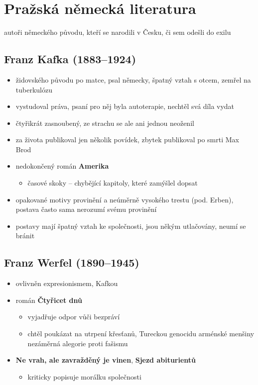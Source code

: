 \section{Pražská německá literatura}
\item autoři německého původu, kteří se narodili v Česku, či sem odešli do exilu
\subsection{Franz Kafka (1883--1924)}
\begin{itemize}
\item židovského původu po matce, psal německy, špatný vztah s otcem, zemřel na tuberkulózu
\item vystudoval práva, psaní pro něj byla autoterapie, nechtěl svá díla vydat
\item čtyřikrát zasnoubený, ze strachu se ale ani jednou neoženil
\item za života publikoval jen několik povídek, zbytek publikoval po smrti Max Brod
\item nedokončený román \textbf{Amerika} 
	\begin{itemize}
	\item časové skoky -- chybějící kapitoly, které zamýšlel dopsat
	\end{itemize}
\item opakované motivy provinění a neúměrně vysokého trestu (pod. Erben), postava často sama nerozumí svému provinění
\item postavy mají špatný vztah ke společnosti, jsou někým utlačovány, neumí se bránit	

\end{itemize}

\subsection{Franz Werfel (1890--1945)}
\begin{itemize}
\item ovlivněn expresionismem, Kafkou
\item román \textbf{Čtyřicet dnů}
	\begin{itemize}
	\item vyjadřuje odpor vůči bezpráví 
	\item chtěl poukázat na utrpení křesťanů, Tureckou genocidu arménské menšiny \ra nezáměrná alegorie proti fašismu
	\end{itemize}
\item \textbf{Ne vrah, ale zavražděný je vinen}, \textbf{Sjezd abiturientů}
	\begin{itemize}
	\item kriticky popisuje morálku společnosti	
	\end{itemize}
\end{itemize}

